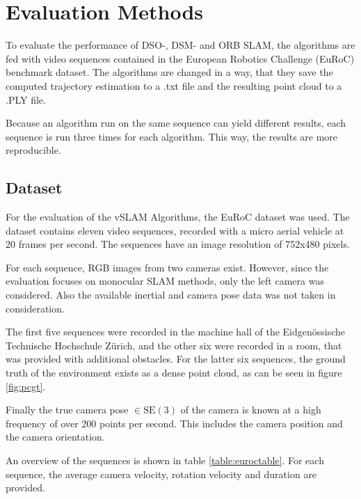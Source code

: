 \section{Evaluation Methods}\label{methsec}

To evaluate the performance of DSO-, DSM- and ORB SLAM, the algorithms are fed with video sequences contained in the 
European Robotics Challenge (EuRoC) benchmark dataset. The algorithms are changed in a way, that they save the computed 
trajectory estimation to a .txt file and the resulting point cloud to a .PLY file. 

Because an algorithm run on the same sequence can yield different results, each sequence is run three times for each algorithm. 
This way, the results are more reproducible. 

\subsection{Dataset}

	For the evaluation of the vSLAM Algorithms, the EuRoC dataset \cite{euroc} was used.
	The dataset contains eleven video sequences, recorded with a micro aerial vehicle at 20 frames per second.
	The sequences have an image resolution of 752x480 pixels.
	
	For each sequence, RGB images from two cameras exist. However, since the evaluation
	focuses on monocular SLAM methods, only the left camera was considered. Also the available 
	inertial and camera pose data was not taken in consideration. 
	
	The first five sequences were recorded in 
	the machine hall of the Eidgenössische Technische Hochschule Zürich, and the other six were recorded in a room, that was provided 
	with additional obstacles. For the latter six sequences, the ground truth of the environment 
	exists as a dense point cloud, as can be seen in figure \ref{fig:pcgt}.


	Finally the true camera pose $\in \text{SE}(3)$ of the 
	camera is known at a high frequency of over 200 points per second. This includes the camera position and the camera orientation. 
	
	An overview of the sequences is shown in table \ref{table:euroctable}. For each sequence, the average camera velocity,
	rotation velocity and duration 
	are provided. 



